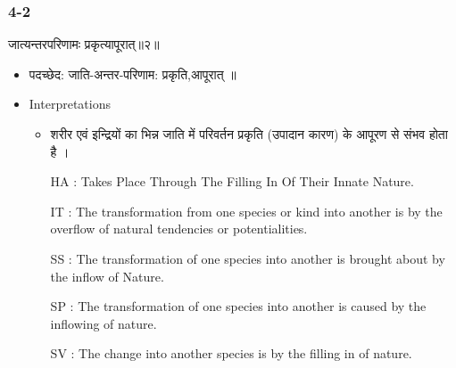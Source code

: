 \begin{frame}[fragile]\frametitle{4-2}
\begin{sanskrit}
जात्यन्तरपरिणामः प्रकृत्यापूरात्॥२॥
\end{sanskrit}

	\begin{itemize}
	\item पदच्छेद:  जाति-अन्तर-परिणाम: प्रकृति,आपूरात् ‌॥
	\item Interpretations
		\begin{itemize}	
		\item शरीर एवं इन्द्रियों का भिन्न जाति में परिवर्तन प्रकृति (उपादान कारण) के आपूरण से संभव होता है ।
		\item [HA]: Takes Place Through The Filling In Of Their Innate Nature.
		\item [IT]: The transformation from one species or kind into another is by the overflow of natural tendencies or potentialities.
		\item [SS]: The transformation of one species into another is brought about by the inflow of Nature.
		\item [SP]: The transformation of one species into another is caused by the inflowing of nature.
		\item [SV]: The change into another species is by the filling in of nature. 
		\end{itemize}
	\end{itemize}
\end{frame}

